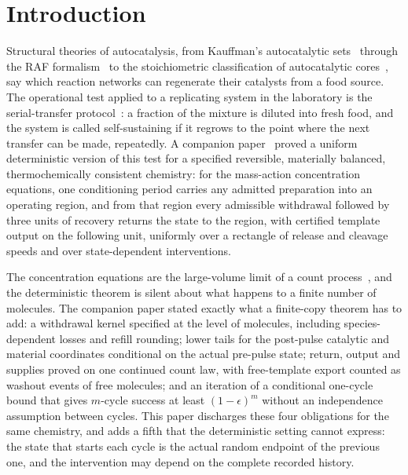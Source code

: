 \documentclass[11pt,a4paper]{article}
\theoremstyle{plain}
\theoremstyle{definition}
\theoremstyle{remark}
\begin{document}
\section{Introduction}\label{sec:intro}

Structural theories of autocatalysis, from Kauffman's autocatalytic sets~\citep{kauffman1986} through the RAF formalism~\citep{hordijk2004,steel2019} to the stoichiometric classification of autocatalytic cores~\citep{blokhuis2020}, say which reaction networks can regenerate their catalysts from a food source. The operational test applied to a replicating system in the laboratory is the serial-transfer protocol~\citep{mills1967,lincoln2009,adamski2020}: a fraction of the mixture is diluted into fresh food, and the system is called self-sustaining if it regrows to the point where the next transfer can be made, repeatedly. A companion paper~\citep{recovery2026} proved a uniform deterministic version of this test for a specified reversible, materially balanced, thermochemically consistent chemistry: for the mass-action concentration equations, one conditioning period carries any admitted preparation into an operating region, and from that region every admissible withdrawal followed by three units of recovery returns the state to the region, with certified template output on the following unit, uniformly over a rectangle of release and cleavage speeds and over state-dependent interventions.

The concentration equations are the large-volume limit of a count process~\citep{kurtz1972,anderson2015}, and the deterministic theorem is silent about what happens to a finite number of molecules. The companion paper stated exactly what a finite-copy theorem has to add: a withdrawal kernel specified at the level of molecules, including species-dependent losses and refill rounding; lower tails for the post-pulse catalytic and material coordinates conditional on the actual pre-pulse state; return, output and supplies proved on one continued count law, with free-template export counted as washout events of free molecules; and an iteration of a conditional one-cycle bound that gives $m$-cycle success at least $(1-\epsilon)^m$ without an independence assumption between cycles. This paper discharges these four obligations for the same chemistry, and adds a fifth that the deterministic setting cannot express: the state that starts each cycle is the actual random endpoint of the previous one, and the intervention may depend on the complete recorded history.
\end{document}
